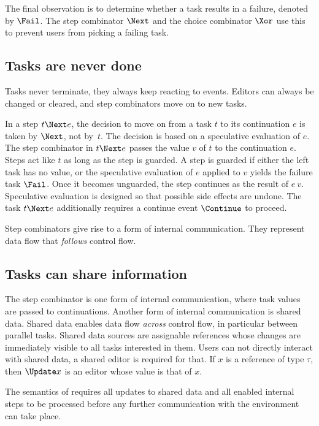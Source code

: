The final observation is to determine whether a task results in a failure, denoted by $\Fail$.
The step combinator $\Next$ and the choice combinator $\Xor$ use this to prevent users from picking a failing task.



\subsection{Tasks are never done}

Tasks never terminate, they always keep reacting to events.
Editors can always be changed or cleared, and step combinators move on to new tasks.

In a step $t \Next e$, the decision to move on from a task $t$ to its continuation $e$ is taken by $\Next$, not by~$t$.
The decision is based on a speculative evaluation of $e$.
The step combinator in $t \Next e$ passes the value $v$ of $t$ to the continuation $e$.
Steps act like $t$ as long as the step is guarded.
A step is guarded if either the left task has no value, or the speculative evaluation of $e$ applied to $v$ yields the failure task $\Fail$.
Once it becomes unguarded, the step continues as the result of $e\ v$.
Speculative evaluation is designed so that possible side effects are undone.
The task $t \Next e$ additionally requires a continue event $\Continue$ to proceed.

Step combinators give rise to a form of internal communication.
They represent data flow that \emph{follows} control flow.


\subsection{Tasks can share information}

The step combinator is one form of internal communication, where task values are passed to continuations.
Another form of internal communication is shared data.
Shared data enables data flow \emph{across} control flow, in particular between parallel tasks.
Shared data sources are assignable references whose changes are immediately visible to all tasks interested in them.
Users can not directly interact with shared data, a shared editor is required for that.
If $x$ is a reference of type $\tau$, then $\Update x$ is an editor whose value is that of $x$.

The semantics of \TOPHAT requires all updates to shared data and all enabled internal steps to be processed before any further communication with the environment can take place.



